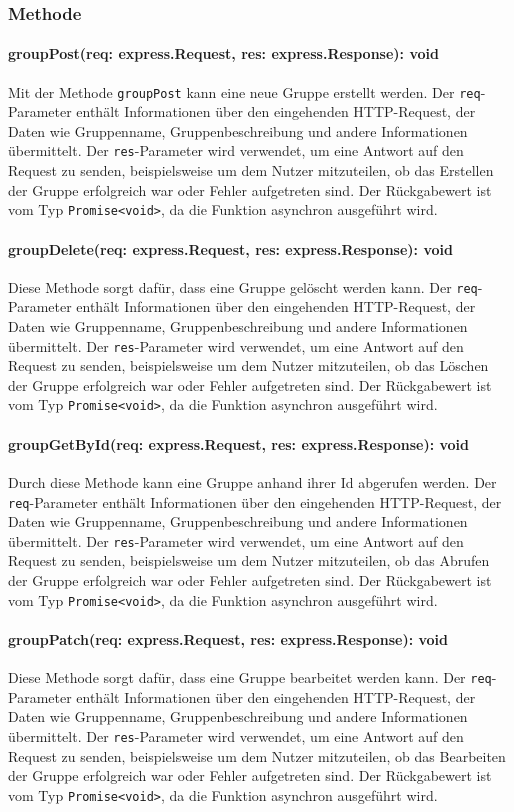 \documentclass{entwurfsheft}
\begin{document}
\subsubsection*{Methode}
\paragraph{groupPost(req: express.Request, res: express.Response): void}
Mit der Methode \texttt{groupPost} kann eine neue Gruppe erstellt werden. Der \texttt{req}-Parameter enthält Informationen über den eingehenden HTTP-Request, der Daten wie Gruppenname, Gruppenbeschreibung und andere Informationen übermittelt. Der \texttt{res}-Parameter wird verwendet, um eine Antwort auf den Request zu senden, beispielsweise um dem Nutzer mitzuteilen, ob das Erstellen der Gruppe erfolgreich war oder Fehler aufgetreten sind.
Der Rückgabewert ist vom Typ \texttt{Promise<void>}, da die Funktion asynchron ausgeführt wird.
\paragraph{groupDelete(req: express.Request, res: express.Response): void}
Diese Methode sorgt dafür, dass eine Gruppe gelöscht werden kann. Der \texttt{req}-Parameter enthält Informationen über den eingehenden HTTP-Request, der Daten wie Gruppenname, Gruppenbeschreibung und andere Informationen übermittelt. Der \texttt{res}-Parameter wird verwendet, um eine Antwort auf den Request zu senden, beispielsweise um dem Nutzer mitzuteilen, ob das Löschen der Gruppe erfolgreich war oder Fehler aufgetreten sind.
Der Rückgabewert ist vom Typ \texttt{Promise<void>}, da die Funktion asynchron ausgeführt wird.
\paragraph{groupGetById(req: express.Request, res: express.Response): void}
Durch diese Methode kann eine Gruppe anhand ihrer Id abgerufen werden. Der \texttt{req}-Parameter enthält Informationen über den eingehenden HTTP-Request, der Daten wie Gruppenname, Gruppenbeschreibung und andere Informationen übermittelt. Der \texttt{res}-Parameter wird verwendet, um eine Antwort auf den Request zu senden, beispielsweise um dem Nutzer mitzuteilen, ob das Abrufen der Gruppe erfolgreich war oder Fehler aufgetreten sind.
Der Rückgabewert ist vom Typ \texttt{Promise<void>}, da die Funktion asynchron ausgeführt wird.
\paragraph{groupPatch(req: express.Request, res: express.Response): void}
Diese Methode sorgt dafür, dass eine Gruppe bearbeitet werden kann. Der \texttt{req}-Parameter enthält Informationen über den eingehenden HTTP-Request, der Daten wie Gruppenname, Gruppenbeschreibung und andere Informationen übermittelt. Der \texttt{res}-Parameter wird verwendet, um eine Antwort auf den Request zu senden, beispielsweise um dem Nutzer mitzuteilen, ob das Bearbeiten der Gruppe erfolgreich war oder Fehler aufgetreten sind.
Der Rückgabewert ist vom Typ \texttt{Promise<void>}, da die Funktion asynchron ausgeführt wird.
\end{document}
